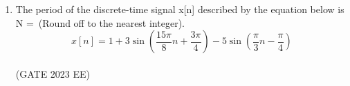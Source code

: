 \begin{enumerate}[label=\thechapter.\arabic*,ref=\thechapter.\theenumi]
\solution
\newpage

\item The period of the discrete-time signal x[n] described by the equation below is N =\ (Round off to the nearest integer).
$$x[n] = 1 + 3\sin\left(\frac{15\pi}{8}n + \frac{3\pi}{4}\right) - 5\sin\left(\frac{\pi}{3}n - \frac{\pi}{4}\right)$$\\
\hfill (GATE 2023 EE)
\solution

\newpage

\end{enumerate}
